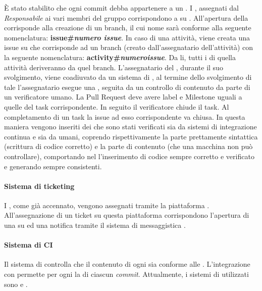 È stato stabilito che ogni commit debba appartenere a un . I , assegnati dal \textit{Responsabile} ai vari membri del gruppo corrispondono a  su . All'apertura della  corrisponde alla creazione di un branch, il cui nome sarà conforme alla seguente nomenclatura: \textbf{issue\#\textit{numero issue}}. In caso di una attivit\`a, viene creata una issue su  che corrisponde ad un branch (creato dall'assegnatario dell'attivit\`a) con la seguente nomenclatura: \textbf{activity\#\textit{numeroissue}}. Da li, tutti i  di quella attivit\`a deriveranno da quel branch. L'assegnatario del , durante il suo svolgimento, viene coadiuvato da un sistema di , al termine dello svolgimento di tale  l'assegnatario esegue una , seguita da un controllo di contenuto da parte di un verificatore umano. La Pull Request deve avere label e Milestone uguali a quelle del task corrispondente. In seguito il verificatore
chiude il task. Al completamento di un task la issue ad esso corrispondente va chiusa.
In questa maniera vengono inseriti dei  che sono stati verificati sia da sistemi di integrazione continua e sia da umani, coprendo rispettivamente la parte prettamente sintattica (scrittura di codice corretto) e la parte di contenuto (che una macchina non pu\`o controllare), comportando nel  l'inserimento di codice sempre corretto e verificato e generando  sempre consistenti.

\paragraph*{Sistema di ticketing} I , come già accennato, vengono assegnati tramite la piattaforma . All'assegnazione di un ticket su questa piattaforma corrispondono l'apertura di una  su  ed una notifica tramite il sistema di messaggistica .

\paragraph*{Sistema di CI}Il sistema di  controlla che il contenuto di ogni  sia conforme alle \NormeDiProgetto. L'integrazione con  permette per ogni  la  di ciascun \textit{commit}. Attualmente, i sistemi di  utilizzati sono  e .


